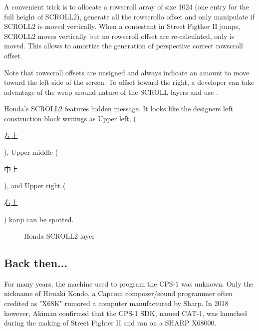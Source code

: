 A convenient trick is to allocate a rowscroll array of size 1024 (one entry for the full height of SCROLL2), generate all the rowscrollo offset and only manipulate  if SCROLL2 is moved vertically. When a contestant in Street Figther II jumps, SCROLL2 moves vertically but no rowscroll offset are re-calculated, only   is moved. This allows to amortize the generation of perspective correct rowscroll offset.

 


Note that rowscroll offsets are unsigned and always indicate an amount to move toward the left side of the screen. To offset toward the right, a developer can take advantage of the wrap around nature of the SCROLL layers and use .

\begin{trivia}
Honda's SCROLL2 features hidden message. It looks like the designers left construction block writings as Upper left, (\begin{CJK}{UTF8}{min}左上\end{CJK}), Upper middle (\begin{CJK}{UTF8}{min}中上\end{CJK}), and Upper right (\begin{CJK}{UTF8}{min}右上\end{CJK}) kanji can be spotted.
\end{trivia}




\begin{figure}[H]
 \caption*{Honda SCROLL2 layer}%
 \end{figure}%
\pagebreak















\subsection{Back then...}
For many years, the machine used to program the CPS-1 was unknown. Only the nickname of Hiroaki Kondo, a Capcom composer/sound programmer often credited as "X68K" rumored a computer manufactured by Sharp. In 2018 however,  Akiman confirmed\cite{x68000usage1}\cite{x68000usage2} that the CPS-1 SDK, named CAT-1, was launched during the making of Street Fighter II and ran on a SHARP X68000.

